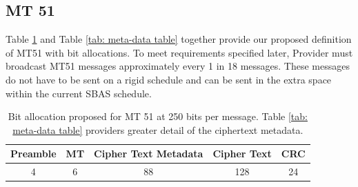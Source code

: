 \documentclass[letterpaper,times]{IONconf/IONconf}
\begin{document}
\subsection{MT 51}
Table \ref{tab: high-level table} and Table \ref{tab: meta-data table} together provide our proposed definition of MT51 with bit allocations.
To meet requirements specified later, Provider must broadcast MT51 messages approximately every 1 in 18 messages.
These messages do not have to be sent on a rigid schedule and can be sent in the extra space within the current SBAS schedule.

\begin{table}[H]
\center
\begin{tabular}{|c|c|c|c|c|} \hline
	Preamble & MT & Cipher Text Metadata & Cipher Text & CRC \\ \hline
	4 & 6 & 88 & 128 & 24 \\ \hline
\end{tabular}
\caption{Bit allocation proposed for MT 51 at 250 bits per message. Table \ref{tab: meta-data table} providers greater detail of the ciphertext metadata.}
\label{tab: high-level table}
\end{table}
\end{document}
